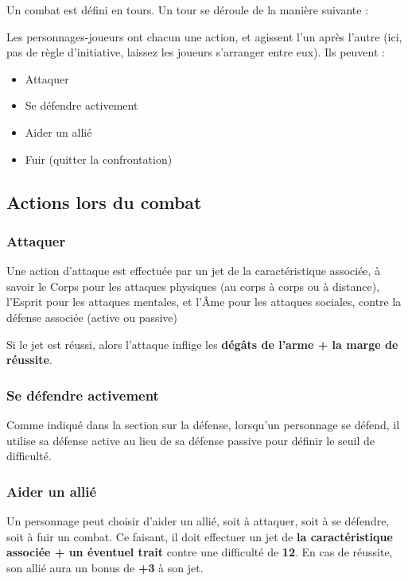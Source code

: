 \documentclass[twoside,12pt,english]{book}
\begin{document}
Un combat est défini en tours. Un tour se déroule de la manière suivante :

Les personnages-joueurs ont chacun une action, et agissent l'un après l'autre (ici, pas de règle d'initiative, laissez les joueurs s'arranger entre eux). Ils peuvent :

\begin{itemize}
\item Attaquer
\item Se défendre activement
\item Aider un allié
\item Fuir (quitter la confrontation)
\end{itemize}

\subsection{Actions lors du combat}

\subsubsection*{Attaquer}

Une action d'attaque est effectuée par un jet de la caractéristique associée, à savoir le Corps pour les attaques physiques (au corps à corps ou à distance), l'Esprit pour les attaques mentales, et l'Âme pour les attaques sociales, contre la défense associée (active ou passive)

Si le jet est réussi, alors l'attaque inflige les \textbf{dégâts de l'arme + la marge de réussite}.

\subsubsection*{Se défendre activement}

Comme indiqué dans la section sur la défense, lorsqu'un personnage se défend, il utilise sa défense active au lieu de sa défense passive pour définir le seuil de difficulté.

\subsubsection*{Aider un allié}

Un personnage peut choisir d'aider un allié, soit à attaquer, soit à se défendre, soit à fuir un combat. Ce faisant, il doit effectuer un jet de \textbf{la caractéristique associée + un éventuel trait} contre une difficulté de \textbf{12}. En cas de réussite, son allié aura un bonus de \textbf{+3} à son jet.
\end{document}
